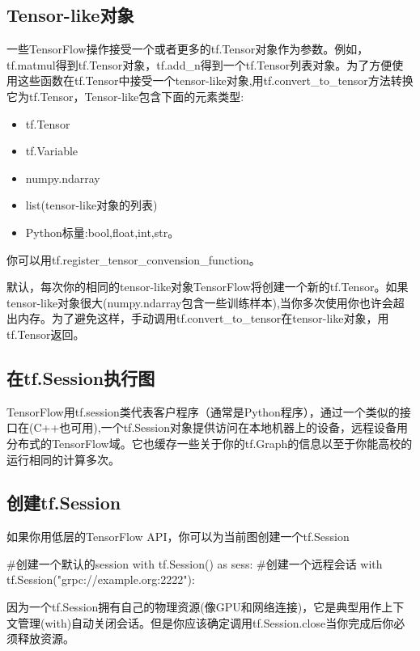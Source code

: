 \subsection{Tensor-like对象}
一些TensorFlow操作接受一个或者更多的tf.Tensor对象作为参数。例如，tf.matmul得到tf.Tensor对象，tf.add\_n得到一个tf.Tensor列表对象。为了方便使用这些函数在tf.Tensor中接受一个tensor-like对象,用tf.convert\_to\_tensor方法转换它为tf.Tensor，Tensor-like包含下面的元素类型:
\begin{itemize}
\item tf.Tensor
\item tf.Variable
\item numpy.ndarray
\item list(tensor-like对象的列表)
\item Python标量:bool,float,int,str。
\end{itemize}
你可以用tf.register\_tensor\_convension\_function。

默认，每次你的相同的tensor-like对象TensorFlow将创建一个新的tf.Tensor。如果tensor-like对象很大(numpy.ndarray包含一些训练样本),当你多次使用你也许会超出内存。为了避免这样，手动调用tf.convert\_to\_tensor在tensor-like对象，用tf.Tensor返回。
\subsection{在tf.Session执行图}
TensorFlow用tf.session类代表客户程序（通常是Python程序），通过一个类似的接口在(C++也可用),一个tf.Session对象提供访问在本地机器上的设备，远程设备用分布式的TensorFlow域。它也缓存一些关于你的tf.Graph的信息以至于你能高校的运行相同的计算多次。
\subsection{创建tf.Session}
如果你用低层的TensorFlow API，你可以为当前图创建一个tf.Session
\begin{python}
#创建一个默认的session
with tf.Session() as sess:
#创建一个远程会话
with tf.Session("grpc://example.org:2222"):
\end{python}
因为一个tf.Session拥有自己的物理资源(像GPU和网络连接)，它是典型用作上下文管理(with)自动关闭会话。但是你应该确定调用tf.Session.close当你完成后你必须释放资源。

